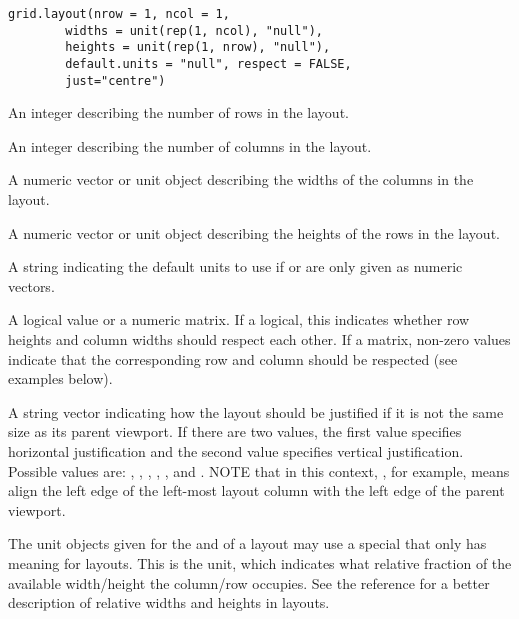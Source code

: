 %
\begin{Usage}
\begin{verbatim}
grid.layout(nrow = 1, ncol = 1,
        widths = unit(rep(1, ncol), "null"),
        heights = unit(rep(1, nrow), "null"),
        default.units = "null", respect = FALSE,
        just="centre")
\end{verbatim}
\end{Usage}
%
\begin{Arguments}
\begin{ldescription}
\item[\code{nrow}] An integer describing the number of rows in the layout.
\item[\code{ncol}] An integer describing the number of columns in the layout.
\item[\code{widths}] A numeric vector or unit object
describing the widths of the columns
in the layout.
\item[\code{heights}] A numeric vector or unit object
describing the heights of the rows
in the layout.
\item[\code{default.units}] A string indicating the default units to use
if  or  are only given as numeric vectors. 
\item[\code{respect}] A logical value or a numeric matrix.
If a logical, this indicates whether
row heights and column widths should respect each other.
If a matrix, non-zero values indicate that the corresponding
row and column should be respected (see examples below).

\item[\code{just}] A string vector indicating how the layout should be
justified if it is not the same size as its parent viewport.
If there are two values, the first
value specifies horizontal justification and the second value specifies
vertical justification.  Possible values are: ,
, , , ,
and .  NOTE that in this context,
, for example, means align the left
edge of the left-most layout column with the left edge of the
parent viewport.
\end{ldescription}
\end{Arguments}
%
\begin{Details}\relax
The unit objects given for the  and 
of a layout may use a special  that only has
meaning for layouts.  This is the  unit, which
indicates what relative fraction of the available width/height the
column/row occupies.  See the reference for a better description
of relative widths and heights in layouts.
\end{Details}

